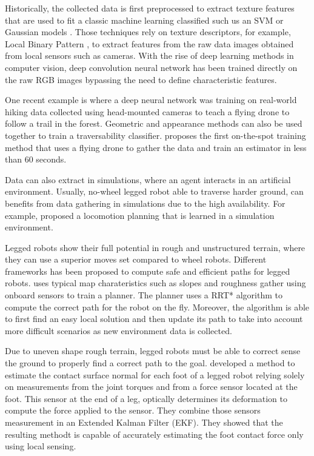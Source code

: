 \documentclass[../document.tex]{subfiles}
\begin{document}
Historically, the collected data is first preprocessed to extract texture features that are used to fit a classic machine learning classified such us an SVM \cite{ugur2010traversability} or Gaussian models \cite{sofman2006improving}. Those techniques rely on texture descriptors, for example, Local Binary Pattern \cite{ojala2002multiresolution}, to extract features from the raw data images obtained from local sensors such as cameras.
With the rise of deep learning methods in computer vision, deep convolution neural network has been trained directly on the raw RGB images bypassing the need to define characteristic features.

One recent example is \cite{giusti2015amachine} where a deep neural network was training on real-world hiking data collected using head-mounted cameras to teach a flying drone to follow a trail in the forest. 
Geometric and appearance methods can also be used together to train a traversability classifier. \cite{delmerico2017onthespot} proposes the first on-the-spot training method that uses a flying drone to gather the data and train an estimator in less than 60 seconds. 

Data can also extract in simulations, where an agent interacts in an artificial environment. Usually, no-wheel legged robot able to traverse harder ground, can benefits from data gathering in simulations due to the high availability. For example, \cite{tobias2017anytime} proposed a locomotion planning that is learned in a simulation environment. 

Legged robots show their full potential in rough and unstructured terrain, where they can use a superior moves set compared to wheel robots. Different frameworks has been proposed to compute safe and efficient paths for  legged robots. \cite{wermelinger2016navigation} uses typical map charateristics such as slopes and roughness gather using onboard sensors to train a planner. The planner uses a RRT* algorithm to compute the correct path for the robot on the fly. Moreover, the algorithm is able to first find an easy local solution and then update its path to take into account more difficult scenarios as new environment  data is collected. 

Due to uneven shape rough terrain, legged robots must be able to correct sense the ground to properly find a correct path to the goal. \cite{wagner2016foot} developed a method to estimate the contact surface normal for each foot of a legged robot relying solely on measurements from the joint torques and from a force sensor located at the foot. This sensor at the end of a leg, optically determines its deformation to compute the force applied to the sensor. They combine those sensors measurement in an Extended Kalman Filter (EKF). They showed that the resulting methodt is capable of accurately estimating the foot contact force only using local sensing.
\end{document}
